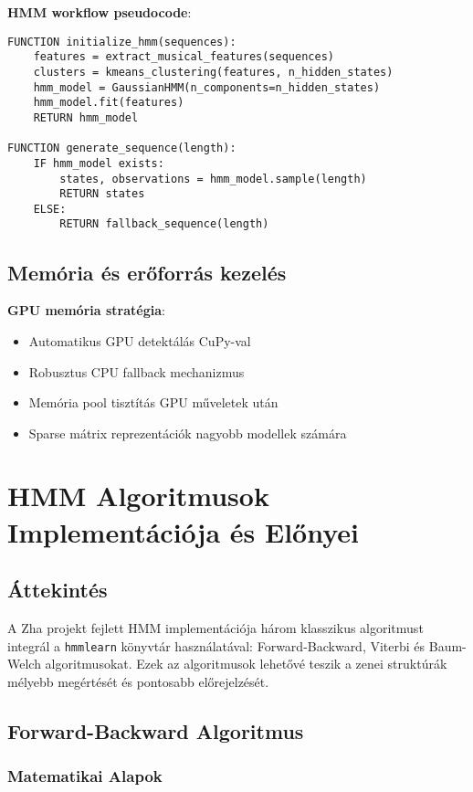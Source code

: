 \textbf{HMM workflow pseudocode}:
\begin{verbatim}
FUNCTION initialize_hmm(sequences):
    features = extract_musical_features(sequences)
    clusters = kmeans_clustering(features, n_hidden_states)
    hmm_model = GaussianHMM(n_components=n_hidden_states)
    hmm_model.fit(features)
    RETURN hmm_model

FUNCTION generate_sequence(length):
    IF hmm_model exists:
        states, observations = hmm_model.sample(length)
        RETURN states
    ELSE:
        RETURN fallback_sequence(length)
\end{verbatim}

\subsection{Memória és erőforrás kezelés}

\textbf{GPU memória stratégia}:
\begin{itemize}
    \item Automatikus GPU detektálás CuPy-val
    \item Robusztus CPU fallback mechanizmus
    \item Memória pool tisztítás GPU műveletek után
    \item Sparse mátrix reprezentációk nagyobb modellek számára
\end{itemize}

\section{HMM Algoritmusok Implementációja és Előnyei}

\subsection{Áttekintés}

A Zha projekt fejlett HMM implementációja három klasszikus algoritmust integrál a \texttt{hmmlearn} könyvtár használatával: Forward-Backward, Viterbi és Baum-Welch algoritmusokat. Ezek az algoritmusok lehetővé teszik a zenei struktúrák mélyebb megértését és pontosabb előrejelzését.

\subsection{Forward-Backward Algoritmus}

\subsubsection{Matematikai Alapok}

